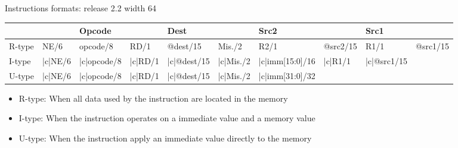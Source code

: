 \begin{Frame}{Instructions formats: release 2.2 width 64 }

\footnotesize\begin{tabular}{|llllllllll|}\hline
 & & Opcode & &Dest&&Src2&&Src1&\\ \hline
R-type&NE/6&opcode/8&RD/1&@dest/15&Mis./2&R2/1&@src2/15&R1/1&@src1/15\\
 I-type&{|c|}{NE/6}&{|c|}{opcode/8}&{|c|}{RD/1}&{|c|}{@dest/15}&{|c|}{Mis./2}&{|c|}{imm[15:0]/16}&{|c|}{R1/1}&{|c|}{@src1/15}\\
 U-type&{|c|}{NE/6}&{|c|}{opcode/8}&{|c|}{RD/1}&{|c|}{@dest/15}&{|c|}{Mis./2}&{|c|}{imm[31:0]/32}\\\hline
\end{tabular}
\begin{itemize}
\item R-type: When all data used by the instruction are located in the memory\item I-type: When the instruction operates on a immediate value and a memory value\item U-type: When the instruction apply an immediate value directly to the memory\end{itemize}
\end{Frame}
